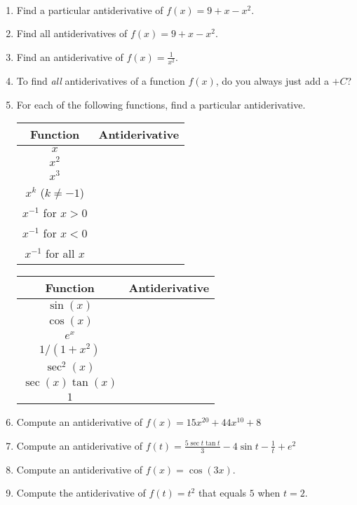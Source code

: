 \documentclass[11pt,fleqn]{article}
\def\ds{\displaystyle}
\begin{document}
\begin{center}
  \Large{}\\
\end{center}


\begin{enumerate}
\item Find a particular antiderivative of $f(x)=9+x-x^2.$
\vfill
\item Find all antiderivatives of $f(x)=9+x-x^2.$
\vfill
\item Find an antiderivative of $f(x)=\frac{1}{x^2}.$
\vfill
\item To find \emph{all} antiderivatives of a function $f(x)$, do you always just add a $+C$?
\vfill
\item For each of the following functions, find a particular antiderivative.

\doublespacing
\begin{tabular}{|c|c|}\hline
Function & Antiderivative \\ \hline
$\ds x$ & \\ \hline
$\ds x^2$ &\\ \hline
$\ds x^3$ &\\ \hline
$\ds x^k$ ($k\neq -1$) &\\  \hline
$\ds x^{-1}$ for $x>0$&\\ \hline
$\ds x^{-1}$ for $x<0$&\\ \hline
$\ds x^{-1}$ for all $x$&\\ \hline
\end{tabular}
\quad
\begin{tabular}{|c|c|}\hline
Function & Antiderivative \\ \hline
$\ds \sin(x)$ & \\ \hline
$\ds \cos(x)$ &\\ \hline
$\ds e^x$ &\\ \hline
$\ds 1/(1+x^2)$  &\\ \hline
$\ds \sec^2(x)$ &\\ \hline
$\ds \sec(x)\tan(x)$ &\\ \hline
$\ds 1$ &\\ \hline
\end{tabular}
\singlespacing
\newpage
\item Compute an antiderivative of $f(x) = 15 x^{20} + 44 x^{10} + 8$
\vfill
\item Compute an antiderivative of $\ds f(t) = \frac{5\sec t \tan t}{3} - 4 \sin t -\frac{1}{t}+e^2$
\vfill

\item Compute an antiderivative of $f(x)=\cos(3x)$.
\vfill


\item Compute the antiderivative of $f(t)=t^2$ that equals $5$ when $t=2$.
\vfill


\end{enumerate}
\end{document}

